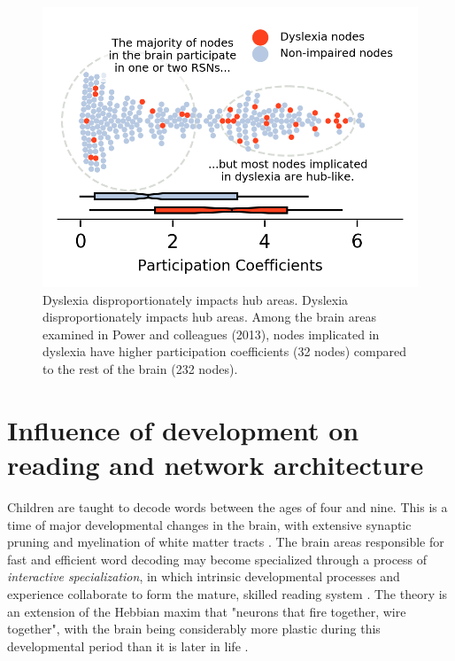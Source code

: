 \begin{figure}[h!]
\centering
\includegraphics[width=5in]{images/ch1-dyslexia-hubs.png}
    \caption{Dyslexia disproportionately impacts hub areas. Dyslexia disproportionately impacts hub areas. Among the brain areas examined in Power and colleagues (2013), nodes implicated in dyslexia have higher participation coefficients (32 nodes) compared to the rest of the brain (232 nodes).}
\label{fig:ch1-dyslexia-hubs}
\end{figure}

\section{Influence of development on reading and network architecture}

Children are taught to decode words between the ages of four and nine. This is a time of major developmental changes in the brain, with extensive synaptic pruning and myelination of white matter tracts \cite{Wandell2013}. The brain areas responsible for fast and efficient word decoding may become specialized through a process of \textit{interactive specialization}, in which intrinsic developmental processes and experience collaborate to form the mature, skilled reading system \cite{Johnson2011, Klingberg2014}. The theory is an extension of the Hebbian maxim that "neurons that fire together, wire together", with the brain being considerably more plastic during this developmental period than it is later in life \cite{Hebb1949}.

